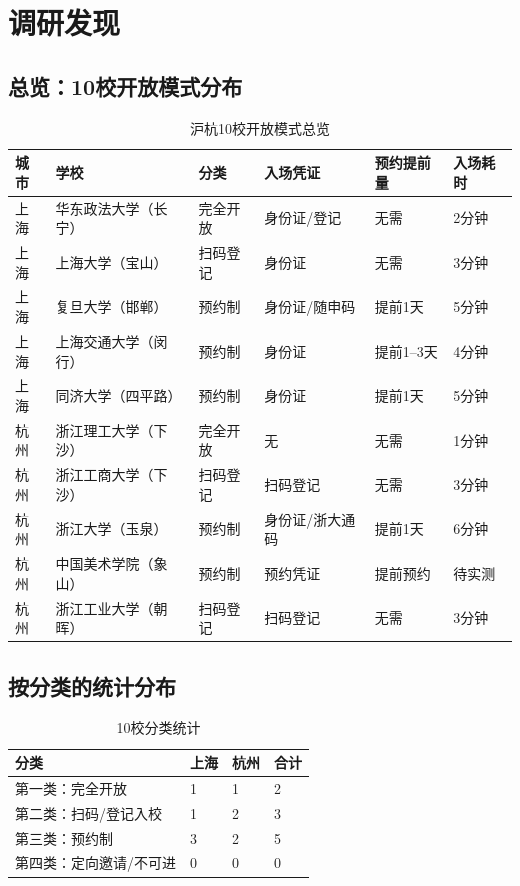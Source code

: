 \documentclass[12pt]{article}
\begin{document}
\section{调研发现}

\subsection{总览：10校开放模式分布}

\begin{table}[H]
\centering
\caption{沪杭10校开放模式总览}
\label{tab:summary}
\small
\begin{tabular}{p{2.2cm}p{2.2cm}p{1.8cm}p{1.8cm}p{2.2cm}p{2.5cm}}
\toprule
\textbf{城市} & \textbf{学校} & \textbf{分类} & \textbf{入场凭证} & \textbf{预约提前量} & \textbf{入场耗时} \\
\midrule
上海 & 华东政法大学（长宁） & 完全开放 & 身份证/登记 & 无需 & 2分钟 \\
上海 & 上海大学（宝山） & 扫码登记 & 身份证 & 无需 & 3分钟 \\
上海 & 复旦大学（邯郸） & 预约制 & 身份证/随申码 & 提前1天 & 5分钟 \\
上海 & 上海交通大学（闵行） & 预约制 & 身份证 & 提前1–3天 & 4分钟 \\
上海 & 同济大学（四平路） & 预约制 & 身份证 & 提前1天 & 5分钟 \\
\midrule
杭州 & 浙江理工大学（下沙） & 完全开放 & 无 & 无需 & 1分钟 \\
杭州 & 浙江工商大学（下沙） & 扫码登记 & 扫码登记 & 无需 & 3分钟 \\
杭州 & 浙江大学（玉泉） & 预约制 & 身份证/浙大通码 & 提前1天 & 6分钟 \\
杭州 & 中国美术学院（象山） & 预约制 & 预约凭证 & 提前预约 & 待实测 \\
杭州 & 浙江工业大学（朝晖） & 扫码登记 & 扫码登记 & 无需 & 3分钟 \\
\bottomrule
\end{tabular}
\end{table}

\vspace{0.5cm}

\subsection{按分类的统计分布}

\begin{table}[H]
\centering
\caption{10校分类统计}
\label{tab:distribution}
\begin{tabular}{p{3.5cm}p{2.5cm}p{2.5cm}p{2.5cm}}
\toprule
\textbf{分类} & \textbf{上海} & \textbf{杭州} & \textbf{合计} \\
\midrule
第一类：完全开放 & 1 & 1 & 2 \\
第二类：扫码/登记入校 & 1 & 2 & 3 \\
第三类：预约制 & 3 & 2 & 5 \\
第四类：定向邀请/不可进 & 0 & 0 & 0 \\
\bottomrule
\end{tabular}
\end{table}
\end{document}
